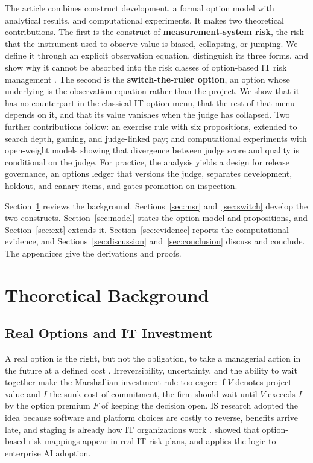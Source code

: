\documentclass[acmsmall,screen,review,anonymous]{acmart}
\theoremstyle{acmdefinition}
\begin{document}
The article combines construct development, a formal option model with analytical results, and computational experiments. It makes two theoretical contributions. The first is the construct of \textbf{measurement-system risk}, the risk that the instrument used to observe value is biased, collapsing, or jumping. We define it through an explicit observation equation, distinguish its three forms, and show why it cannot be absorbed into the risk classes of option-based IT risk management \citep{benaroch2006}. The second is the \textbf{switch-the-ruler option}, an option whose underlying is the observation equation rather than the project. We show that it has no counterpart in the classical IT option menu, that the rest of that menu depends on it, and that its value vanishes when the judge has collapsed. Two further contributions follow: an exercise rule with six propositions, extended to search depth, gaming, and judge-linked pay; and computational experiments with open-weight models showing that divergence between judge score and quality is conditional on the judge. For practice, the analysis yields a design for release governance, an options ledger that versions the judge, separates development, holdout, and canary items, and gates promotion on inspection.

Section~\ref{sec:background} reviews the background. Sections~\ref{sec:msr} and~\ref{sec:switch} develop the two constructs. Section~\ref{sec:model} states the option model and propositions, and Section~\ref{sec:ext} extends it. Section~\ref{sec:evidence} reports the computational evidence, and Sections~\ref{sec:discussion} and~\ref{sec:conclusion} discuss and conclude. The appendices give the derivations and proofs.

\section{Theoretical Background}\label{sec:background}

\subsection{Real Options and IT Investment}

A real option is the right, but not the obligation, to take a managerial action in the future at a defined cost \citep{dixit1994,trigeorgis1996}. Irreversibility, uncertainty, and the ability to wait together make the Marshallian investment rule too eager: if $V$ denotes project value and $I$ the sunk cost of commitment, the firm should wait until $V$ exceeds $I$ by the option premium $F$ of keeping the decision open. IS research adopted the idea because software and platform choices are costly to reverse, benefits arrive late, and staging is already how IT organizations work \citep{benaroch2002,fichman2004,taudes2000}. \citet{benaroch2006} showed that option-based risk mappings appear in real IT risk plans, and \citet{tewari2026} applies the logic to enterprise AI adoption.
\end{document}
